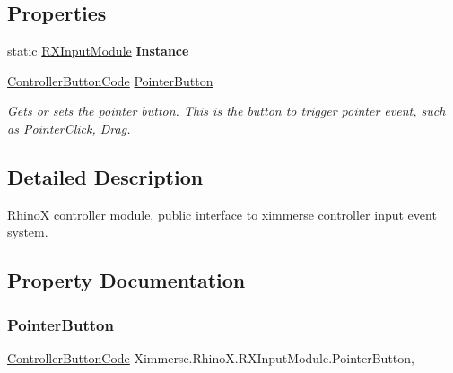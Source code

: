 \subsection*{Properties}
\begin{DoxyCompactItemize}
\item 
\mbox{\label{class_ximmerse_1_1_rhino_x_1_1_r_x_input_module_a16ef45842c84483dcaa87c042459f7f2}} 
static \mbox{\hyperlink{class_ximmerse_1_1_rhino_x_1_1_r_x_input_module}{R\+X\+Input\+Module}} {\bfseries Instance}
\item 
\mbox{\hyperlink{namespace_ximmerse_1_1_rhino_x_a99f73f11bba9d4b424daba6c5a5abc0b}{Controller\+Button\+Code}} \mbox{\hyperlink{class_ximmerse_1_1_rhino_x_1_1_r_x_input_module_a0b32ffc354f00d3e4db96ad7ac43bb35}{Pointer\+Button}}
\begin{DoxyCompactList}\small\item\em Gets or sets the pointer button. This is the button to trigger pointer event, such as Pointer\+Click, Drag. \end{DoxyCompactList}\end{DoxyCompactItemize}


\subsection{Detailed Description}
\mbox{\hyperlink{namespace_ximmerse_1_1_rhino_x}{RhinoX}} controller module, public interface to ximmerse controller input event system. 



\subsection{Property Documentation}
\mbox{\label{class_ximmerse_1_1_rhino_x_1_1_r_x_input_module_a0b32ffc354f00d3e4db96ad7ac43bb35}} 
\subsubsection{\texorpdfstring{Pointer\+Button}{PointerButton}}
{\footnotesize\ttfamily \mbox{\hyperlink{namespace_ximmerse_1_1_rhino_x_a99f73f11bba9d4b424daba6c5a5abc0b}{Controller\+Button\+Code}} Ximmerse.\+Rhino\+X.\+R\+X\+Input\+Module.\+Pointer\+Button\hspace{0.3cm}{\ttfamily [get]}, {\ttfamily [set]}}




